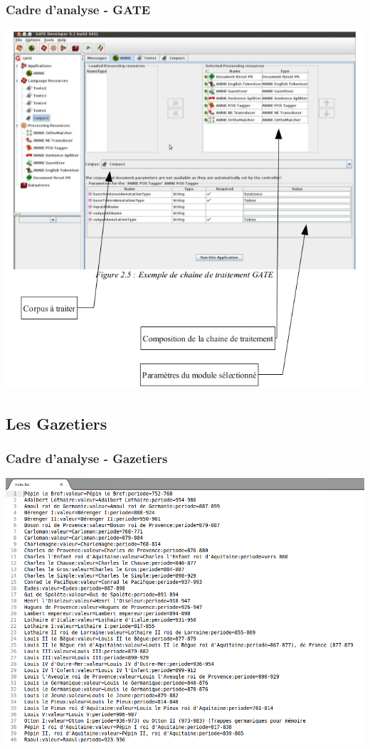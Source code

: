 \documentclass[10pt, compress]{beamer}
\begin{document}
\begin{frame}[fragile]
\frametitle{Cadre d'analyse - GATE}
\includegraphics[scale=0.3]{img/exempleChaineTraitement.png} 
\end{frame}

\subsection{Les Gazetiers}
\begin{frame}[fragile]
\frametitle{Cadre d'analyse - Gazetiers}
\includegraphics[scale=0.2]{img/Gaz.png} 
\end{frame}
\end{document}

